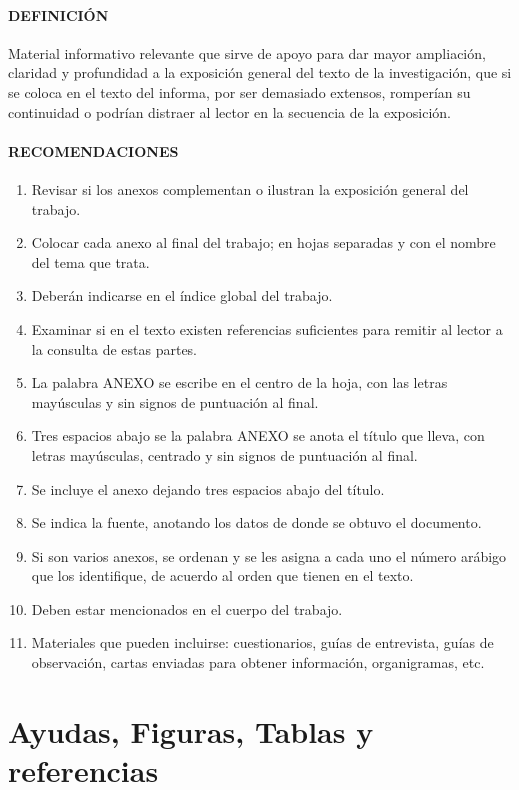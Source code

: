 \paragraph{DEFINICIÓN}
Material informativo relevante que sirve de apoyo para dar mayor ampliación, claridad y profundidad a la exposición general del texto de la investigación, que si se coloca en el texto del informa, por ser demasiado extensos, romperían su continuidad o podrían distraer al lector en la secuencia de la exposición.

\paragraph{RECOMENDACIONES}

\begin{enumerate}
 \item Revisar si los anexos complementan o ilustran la exposición general del trabajo.
 \item Colocar cada anexo al final del trabajo; en hojas separadas y con el nombre del tema que trata.
 \item Deberán indicarse en el índice global del trabajo.
 \item Examinar si en el texto existen referencias suficientes para remitir al lector a la consulta de estas partes.
 \item La palabra ANEXO se escribe en el centro de la hoja, con las letras mayúsculas y sin signos de puntuación al final.
 \item Tres espacios abajo se la palabra ANEXO se anota el título que lleva, con letras mayúsculas, centrado y sin signos de puntuación al final.
 \item Se incluye el anexo dejando tres espacios abajo del título.
 \item Se indica la fuente, anotando los datos de donde se obtuvo el documento.
 \item Si son varios anexos, se ordenan y se les asigna a cada uno el número arábigo que los identifique, de acuerdo al orden que tienen en el texto.
 \item Deben estar mencionados en el cuerpo del trabajo.
 \item Materiales que pueden incluirse: cuestionarios, guías de entrevista, guías de observación, cartas enviadas para obtener información, organigramas, etc.
\end{enumerate}


\section*{Ayudas, Figuras, Tablas y referencias}


